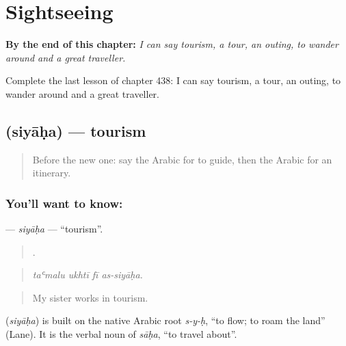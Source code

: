 
\chapter{Sightseeing}
\label{ch:ar-sightseeing}

\begin{chapteropening}
\textbf{By the end of this chapter:} \emph{I can say tourism, a tour, an outing, to wander around and a great traveller.}

Complete the last lesson of chapter 438: I can say tourism, a tour, an outing, to wander around and a great traveller.
\end{chapteropening}

\section[\texorpdfstring{\ar{سياحة} (siyāḥa)}{سياحة (siyāḥa)}]{ (siyāḥa) — tourism}

\label{lesson:AR-C438-siyaha}



\begin{quote}
Before the new one: say the Arabic for to guide, then the Arabic for an itinerary.
\end{quote}

\subsection*{You'll want to know: }
\textbf{} — \emph{siyāḥa} — \textquotedblleft{}tourism\textquotedblright{}.

\begin{quote}
   .
\end{quote}

\begin{quote}
\emph{taʿmalu ukhtī fī as-siyāḥa.}
\end{quote}

\begin{quote}
My sister works in tourism.
\end{quote}

\begin{cousinweb}
\textbf{} (\emph{siyāḥa}) is built on the native Arabic root \emph{s-y-ḥ}, \textquotedblleft{}to flow; to roam the land\textquotedblright{} (Lane). It is the verbal noun of \emph{sāḥa}, \textquotedblleft{}to travel about\textquotedblright{}.
\end{cousinweb}

